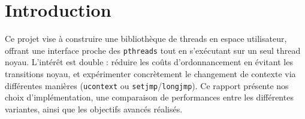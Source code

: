 \section{Introduction}
Ce projet vise à construire une bibliothèque de threads en espace utilisateur,
   offrant une interface proche des \texttt{pthreads} tout en s'exécutant sur un
   seul thread noyau. L'intérêt est double : réduire les coûts d'ordonnancement 
  en évitant les transitions noyau, et expérimenter concrètement le changement  
  de contexte via différentes manières (\texttt{ucontext} ou \texttt{setjmp}/\texttt{longjmp}). Ce
  rapport présente nos choix d'implémentation, une comparaison de performances
  entre les différentes variantes, ainsi que les objectifs avancés réalisés.


